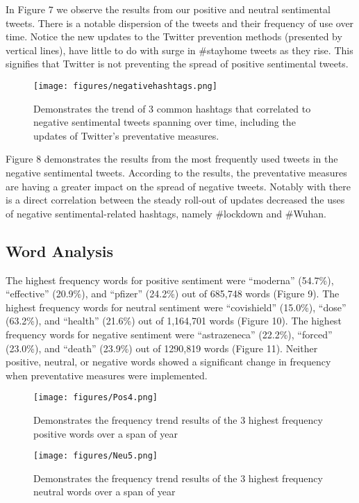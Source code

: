 \documentclass[10pt,twocolumn,letterpaper]{article}
\begin{document}
In Figure 7 we observe the results from our positive and neutral sentimental tweets. There is a notable dispersion of the tweets and their frequency of use over time. Notice the new updates to the Twitter prevention methods (presented by vertical lines), have little to do with surge in \#stayhome tweets as they rise. This signifies that Twitter is not preventing the spread of positive sentimental tweets.

\begin{figure}
  \centering
  \texttt{[image: figures/negativehashtags.png]}
  \caption{Demonstrates the trend of 3 common hashtags that correlated to negative sentimental tweets spanning over time, including the updates of Twitter's preventative measures.}
\end{figure}

Figure 8 demonstrates the results from the most frequently used tweets in the negative sentimental tweets. According to the results, the preventative measures are having a greater impact on the spread of negative tweets. Notably with there is a direct correlation between the steady roll-out of updates decreased the uses of negative sentimental-related hashtags, namely \#lockdown and \#Wuhan.



\subsection{Word Analysis}
The highest frequency words for positive sentiment were “moderna” (54.7\%),  “effective” (20.9\%), and “pfizer” (24.2\%) out of 685,748 words (Figure 9). The highest frequency words for neutral sentiment were “covishield” (15.0\%),  “dose” (63.2\%), and “health” (21.6\%) out of 1,164,701 words (Figure 10). The highest frequency words for negative sentiment were “astrazeneca” (22.2\%),  “forced” (23.0\%), and “death” (23.9\%) out of 1290,819 words (Figure 11). Neither positive, neutral, or negative words showed a significant change in frequency when preventative measures were implemented.

\begin{figure}[H]
  \centering
  \texttt{[image: figures/Pos4.png]}
  \caption{ Demonstrates the frequency trend results of the 3 highest frequency positive words over a span of year}
\end{figure}

\begin{figure}[H]
  \centering
  \texttt{[image: figures/Neu5.png]}
  \caption{Demonstrates the frequency trend results of the 3 highest frequency neutral words over a span of year}
\end{figure}
\end{document}
